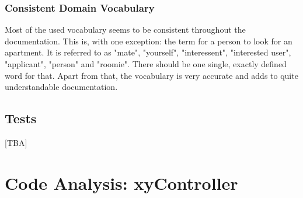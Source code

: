 \documentclass{scrreprt}
\begin{document}
\subsection{Consistent Domain Vocabulary}
Most of the used vocabulary seems to be consistent throughout the documentation. This is, with one exception: the term for a person to look for an apartment. It is referred to as "mate", "yourself", "interessent", "interested user", "applicant", "person" and "roomie". There should be one single, exactly defined word for that. Apart from that, the vocabulary is very accurate and adds to quite understandable documentation.

\section{Tests}
[TBA]

\chapter{Code Analysis: xyController}
\end{document}

